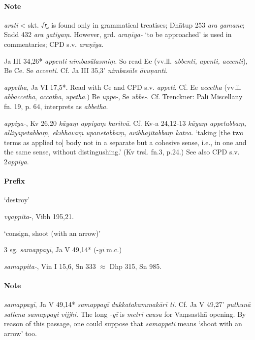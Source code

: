 \documentclass[11pt]{article}
\newcommand*\ṛ{r\symbol{"325}}
\newcommand*\Ṛ{R\symbol{"325}}
\newcommand*\ṝ{r\symbol{"304}\symbol{"325}}
\newcommand*\Ṝ{R\symbol{"304}\symbol{"325}}
\newcommand*\ḷ{l\symbol{"325}}
\newcommand*\ḹ{l\symbol{"304}\symbol{"325}}
\newcommand*\Ḷ{L\symbol{"325}}
\newcommand*\Ḹ{L\symbol{"304}\symbol{"325}}
\begin{document}
\paragraph*{Note}
\textit{arati} < skt. √\textit{r̥}, is found only in grammatical treatises; Dhātup 253 \textit{ara gamane}; Sadd 432 \textit{ara gatiyaṃ.}
However, grd. \textit{araṇīya-} `to be approached' is used in commentaries; CPD s.v. \textit{araṇīya}.

Ja III 34,26* \textit{appenti nimbasūlasmiṃ}. So read Ee (vv.ll. \textit{abbenti, apenti, accenti}), Be Ce.
Se \textit{accenti}.
Cf. Ja III 35,3' \textit{nimbasūle āvuṇanti}.

\textit{appetha}, Ja VI 17,5*. Read with Ce and CPD s.v. \textit{appeti}.
Cf. Ee \textit{accetha} (vv.ll. \textit{abbaccetha}, \textit{accatha}, \textit{upetha}.)
Be \textit{uppe-}, Se \textit{ubbe-}.
Cf. Trenckner: Pali Miscellany fn. 19, p. 64,  interprets as \textit{abbetha}.

 \textit{appiya-}, Kv 26,20 \textit{kāyaṃ appiyaṃ karitvā}.
Cf. Kv-a 24,12-13 \textit{kāyaṃ appe\-tabbaṃ, alliyāpetabbaṃ, ekībhāvaṃ upanetabbaṃ, avibhajitabbaṃ katvā.}
`taking [the two terms as applied to] body not in a separate but a cohesive sense, i.e., in one and the same sense, without distingushing.' (Kv trsl. fn.3, p.24.)
See also CPD s.v. 2\textit{appiya}.

\paragraph*{Prefix}
\begin{description}[leftmargin=\parindent]
\item[vi-] `destroy'
\item[ppp.] \textit{vyappita-}, Vibh 195,21.
\item[sam-] `consign, shoot (with an arrow)'
\item[pret.] 3 sg. \textit{samappayī}, Ja V 49,14* (-\textit{yī} m.c.)
\item[ppp.] \textit{samappita-}, Vin I 15,6, Sn 333 $\approx$ Dhp 315, Sn 985.
\end{description}
\paragraph*{Note}
\textit{samappayī}, Ja V 49,14* \textit{samappayī dukkatakammakārī ti.}
Cf. Ja V 49,27' \textit{puthunā sallena samappayi vijjhi.}
The long \textit{-yī} is \textit{metri causa} for Vaṃsasthā opening.
By reason of this passage, one could suppose that \textit{samappeti} means `shoot with an arrow' too.
\end{document}
